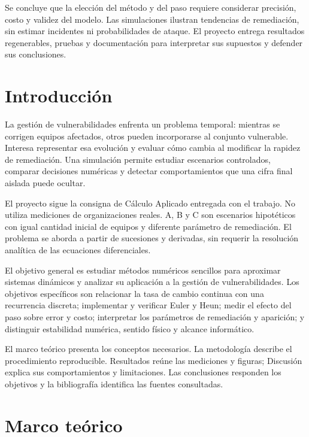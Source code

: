 \documentclass[11pt,a4paper]{article}
\begin{document}
Se concluye que la elección del método y del paso requiere considerar precisión, costo y validez del modelo. Las simulaciones ilustran tendencias de remediación, sin estimar incidentes ni probabilidades de ataque. El proyecto entrega resultados regenerables, pruebas y documentación para interpretar sus supuestos y defender sus conclusiones.
\clearpage
\tableofcontents
\clearpage
\section{Introducción}
La gestión de vulnerabilidades enfrenta un problema temporal: mientras se corrigen equipos afectados, otros pueden incorporarse al conjunto vulnerable. Interesa representar esa evolución y evaluar cómo cambia al modificar la rapidez de remediación. Una simulación permite estudiar escenarios controlados, comparar decisiones numéricas y detectar comportamientos que una cifra final aislada puede ocultar.

El proyecto sigue la consigna de Cálculo Aplicado entregada con el trabajo. No utiliza mediciones de organizaciones reales. A, B y C son escenarios hipotéticos con igual cantidad inicial de equipos y diferente parámetro de remediación. El problema se aborda a partir de sucesiones y derivadas, sin requerir la resolución analítica de las ecuaciones diferenciales.

El objetivo general es estudiar métodos numéricos sencillos para aproximar sistemas dinámicos y analizar su aplicación a la gestión de vulnerabilidades. Los objetivos específicos son relacionar la tasa de cambio continua con una recurrencia discreta; implementar y verificar Euler y Heun; medir el efecto del paso sobre error y costo; interpretar los parámetros de remediación y aparición; y distinguir estabilidad numérica, sentido físico y alcance informático.

El marco teórico presenta los conceptos necesarios. La metodología describe el procedimiento reproducible. Resultados reúne las mediciones y figuras; Discusión explica sus comportamientos y limitaciones. Las conclusiones responden los objetivos y la bibliografía identifica las fuentes consultadas.

\section{Marco teórico}
\end{document}
